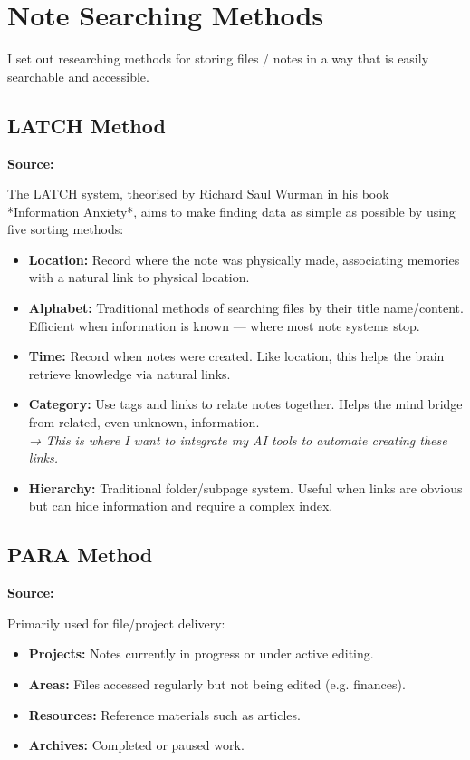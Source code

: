 \section{Note Searching Methods}
\label{research:NoteSearchingMethods}

I set out researching methods for storing files / notes in a way that is easily searchable and accessible.

\subsection*{LATCH Method}
\textbf{Source:} \cite{LATCHInformationArchitecture}

The LATCH system, theorised by Richard Saul Wurman in his book *Information Anxiety*, aims to make finding data as simple as possible by using five sorting methods:

\begin{itemize}
  \item \textbf{Location:} Record where the note was physically made, associating memories with a natural link to physical location.
  \item \textbf{Alphabet:} Traditional methods of searching files by their title name/content. Efficient when information is known — where most note systems stop.
  \item \textbf{Time:} Record when notes were created. Like location, this helps the brain retrieve knowledge via natural links.
  \item \textbf{Category:} Use tags and links to relate notes together. Helps the mind bridge from related, even unknown, information.\\
  \textit{→ This is where I want to integrate my AI tools to automate creating these links.}
  \item \textbf{Hierarchy:} Traditional folder/subpage system. Useful when links are obvious but can hide information and require a complex index.
\end{itemize}


\subsection*{PARA Method}
\textbf{Source:} \cite{PARAMethodSimple}

Primarily used for file/project delivery:

\begin{itemize}
  \item \textbf{Projects:} Notes currently in progress or under active editing.
  \item \textbf{Areas:} Files accessed regularly but not being edited (e.g. finances).
  \item \textbf{Resources:} Reference materials such as articles.
  \item \textbf{Archives:} Completed or paused work.
\end{itemize}


